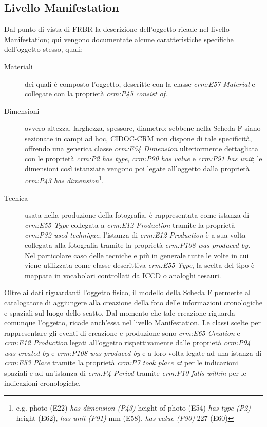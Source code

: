 \subsection{Livello Manifestation}

Dal punto di vista di FRBR la descrizione dell'oggetto ricade nel livello Manifestation; qui vengono documentate alcune caratteristiche specifiche dell'oggetto stesso, quali:
\begin{description}
\item[Materiali] dei quali è composto l'oggetto, descritte con la classe \emph{crm:E57 Material} e collegate con la proprietà \emph{crm:P45 consist of}.
\item[Dimensioni] ovvero altezza, larghezza, spessore, diametro: sebbene nella Scheda F siano sezionate in campi ad hoc, CIDOC-CRM non dispone di tale specificità, offrendo una generica classe \emph{crm:E54 Dimension} ulteriormente dettagliata con le proprietà \emph{crm:P2 has type}, \emph{crm:P90 has value} e \emph{crm:P91 has unit}; le dimensioni così istanziate vengono poi legate all'oggetto dalla proprietà \emph{crm:P43 has dimension}\footnote{e.g. photo (E22) \emph{has dimension (P43)} height of photo (E54) \emph{has type (P2)} height (E62), \emph{has unit (P91)} mm (E58), \emph{has value (P90)} 227 (E60)}.
\item[Tecnica] usata nella produzione della fotografia, è rappresentata come istanza di \emph{crm:E55 Type} collegata a \emph{crm:E12 Production} tramite la proprietà \emph{crm:P32 used technique}; l'istanza di \emph{crm:E12 Production} è a sua volta collegata alla fotografia tramite la proprietà \emph{crm:P108 was produced by}. Nel particolare caso delle tecniche e più in generale tutte le volte in cui viene utilizzata come classe descrittiva \emph{crm:E55 Type}, la scelta del tipo è mappata in vocabolari controllati da ICCD o analoghi tesauri.
\end{description}

Oltre ai dati riguardanti l'oggetto fisico, il modello della Scheda F permette al catalogatore di aggiungere alla creazione della foto delle informazioni cronologiche e spaziali sul luogo dello scatto. Dal momento che tale creazione riguarda comunque l'oggetto, ricade anch'essa nel livello Manifestation. Le classi scelte per rappresentare gli eventi di creazione e produzione sono \emph{crm:E65 Creation} e \emph{crm:E12 Production} legati all'oggetto rispettivamente dalle proprietà \emph{crm:P94 was created by} e \emph{crm:P108 was produced by} e a loro volta legate ad una istanza di \emph{crm:E53 Place} tramite la proprietà \emph{crm:P7 took place at} per le indicazioni spaziali e ad un'istanza di \emph{crm:P4 Period} tramite \emph{crm:P10 falls within} per le indicazioni cronologiche.

